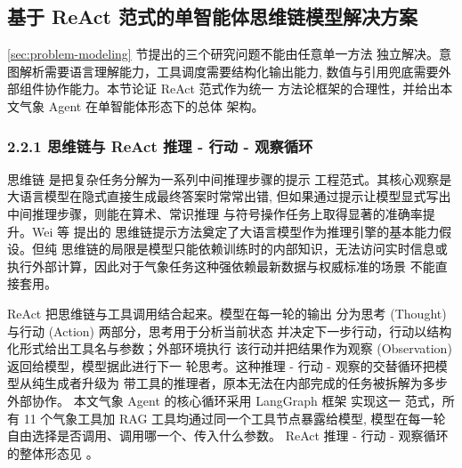 
\subsection{基于 ReAct 范式的单智能体思维链模型解决方案}
\label{sec:react-paradigm}

\ref{sec:problem-modeling} 节提出的三个研究问题不能由任意单一方法
独立解决。意图解析需要语言理解能力，工具调度需要结构化输出能力,
数值与引用兜底需要外部组件协作能力。本节论证 ReAct 范式作为统一
方法论框架的合理性，并给出本文气象 Agent 在单智能体形态下的总体
架构。

\subsubsection*{2.2.1 \quad 思维链与 ReAct 推理 - 行动 - 观察循环}

思维链 \cite{ref13} 是把复杂任务分解为一系列中间推理步骤的提示
工程范式。其核心观察是大语言模型在隐式直接生成最终答案时常常出错,
但如果通过提示让模型显式写出中间推理步骤，则能在算术、常识推理
与符号操作任务上取得显著的准确率提升。Wei 等 \cite{ref13} 提出的
思维链提示方法奠定了大语言模型作为推理引擎的基本能力假设。但纯
思维链的局限是模型只能依赖训练时的内部知识，无法访问实时信息或
执行外部计算，因此对于气象任务这种强依赖最新数据与权威标准的场景
不能直接套用。

ReAct \cite{ref18} 把思维链与工具调用结合起来。模型在每一轮的输出
分为思考 (Thought) 与行动 (Action) 两部分，思考用于分析当前状态
并决定下一步行动，行动以结构化形式给出工具名与参数；外部环境执行
该行动并把结果作为观察 (Observation) 返回给模型，模型据此进行下一
轮思考。这种推理 - 行动 - 观察的交替循环把模型从纯生成者升级为
带工具的推理者，原本无法在内部完成的任务被拆解为多步外部协作。
本文气象 Agent 的核心循环采用 LangGraph 框架 \cite{ref15} 实现这一
范式，所有 11 个气象工具加 RAG 工具均通过同一个工具节点暴露给模型,
模型在每一轮自由选择是否调用、调用哪一个、传入什么参数。
ReAct 推理 - 行动 - 观察循环的整体形态见 。

